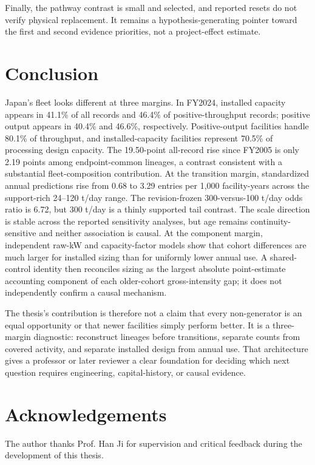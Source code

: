 \documentclass[12pt,a4paper]{article}
\begin{document}
Finally, the pathway contrast is small and selected, and reported resets do not
verify physical replacement. It remains a hypothesis-generating pointer toward
the first and second evidence priorities, not a project-effect estimate.

\section{Conclusion}

Japan's fleet looks different at three margins. In FY2024, installed capacity
appears in 41.1\% of all records and 46.4\% of positive-throughput records;
positive output appears in 40.4\% and 46.6\%, respectively. Positive-output
facilities handle 80.1\% of throughput, and installed-capacity facilities
represent 70.5\% of processing design capacity. The 19.50-point all-record rise
since FY2005 is only 2.19 points among endpoint-common lineages, a contrast
consistent with a substantial fleet-composition contribution. At the transition
margin, standardized annual predictions rise from 0.68 to 3.29 entries per
1,000 facility-years across the support-rich 24--120 t/day range. The revision-frozen
300-versus-100 t/day odds ratio is 6.72, but 300 t/day is a thinly supported tail
contrast. The scale direction is stable across the reported sensitivity analyses, but age remains
continuity-sensitive and neither association is causal. At the component
margin, independent raw-kW and capacity-factor models show that cohort
differences are much larger for installed sizing than for uniformly lower annual
use. A shared-control identity then reconciles sizing as the largest absolute
point-estimate accounting component of each older-cohort gross-intensity gap; it
does not independently
confirm a causal mechanism.

The thesis's contribution is therefore not a claim that every non-generator is
an equal opportunity or that newer facilities simply perform better. It is a
three-margin diagnostic: reconstruct lineages before transitions, separate
counts from covered activity, and separate installed design from annual use.
That architecture gives a professor or later reviewer a clear foundation for
deciding which next question requires engineering, capital-history, or causal
evidence.

\section*{Acknowledgements}

The author thanks Prof. Han Ji for supervision and critical feedback during the
development of this thesis.
\end{document}
